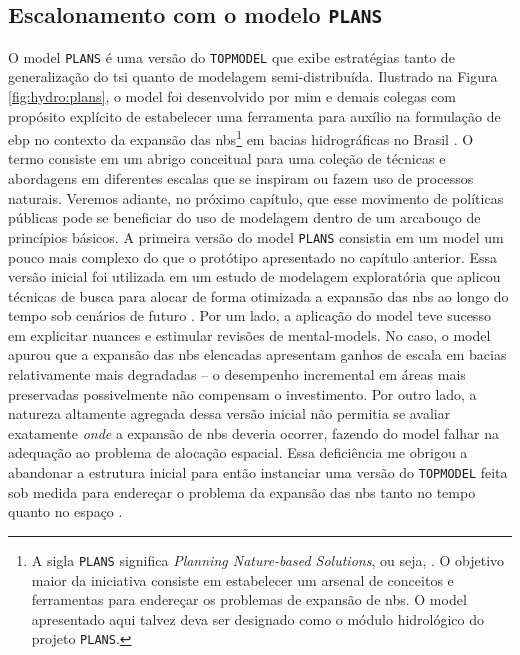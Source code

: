\documentclass[./main.tex]{subfiles}
\begin{document}
\subsection{Escalonamento com o modelo \texttt{PLANS}} \label{sec:hydro:plans}

\par O \gls{model} \texttt{PLANS} é uma versão do \texttt{TOPMODEL} que exibe estratégias tanto de generalização do \gls{tsi} quanto de modelagem semi-distribuída. Ilustrado na Figura \ref{fig:hydro:plans}, o \gls{model} foi desenvolvido por mim e demais colegas com propósito explícito de estabelecer uma ferramenta para auxílio na formulação de \gls{ebp} no contexto da expansão das \acrfull{nbs}\footnote{A sigla \texttt{PLANS} significa \textit{Planning Nature-based Solutions}, ou seja, . O objetivo maior da iniciativa consiste em estabelecer um arsenal de conceitos e ferramentas para endereçar os problemas de expansão de \acrshort{nbs}. O \gls{model} apresentado aqui talvez deva ser designado como o módulo hidrológico do projeto \texttt{PLANS}.} em bacias hidrográficas no Brasil \cite{Possantti2022a, Possantti2023a}. O termo  consiste em um abrigo conceitual para uma coleção de técnicas e abordagens em diferentes escalas que se inspiram ou fazem uso de processos naturais. Veremos adiante, no próximo capítulo, que esse movimento de políticas públicas pode se beneficiar do uso de modelagem dentro de um arcabouço de princípios básicos. A primeira versão do \gls{model} \texttt{PLANS} consistia em um \gls{model} um pouco mais complexo do que o protótipo apresentado no capítulo anterior. Essa versão inicial foi utilizada em um estudo de modelagem exploratória que aplicou técnicas de busca para alocar de forma otimizada a expansão das \acrshort{nbs} ao longo do tempo sob cenários de futuro \cite{Possantti2022a}. Por um lado, a aplicação do \gls{model} teve sucesso em explicitar nuances e estimular revisões de \gls{mental-models}. No caso, o \gls{model} apurou que a expansão das \acrshort{nbs} elencadas apresentam ganhos de escala em bacias relativamente mais degradadas -- o desempenho incremental em áreas mais preservadas possivelmente não compensam o investimento. Por outro lado, a natureza altamente agregada dessa versão inicial não permitia se avaliar exatamente \textit{onde} a expansão de \acrshort{nbs} deveria ocorrer, fazendo do \gls{model} falhar na adequação ao problema de alocação espacial. Essa deficiência me obrigou a abandonar a estrutura inicial para então instanciar uma versão do \texttt{TOPMODEL} feita sob medida para endereçar o problema da expansão das \acrshort{nbs} tanto no tempo quanto no espaço \cite{Possantti2023a}.     
\end{document}
